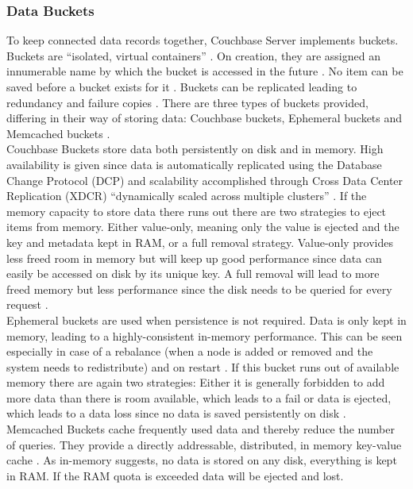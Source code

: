 \subsubsection{Data Buckets}
To keep connected data records together, Couchbase Server implements buckets. Buckets are “isolated, virtual containers” \parencite{objelean}. On creation, they are assigned an innumerable name by which the bucket is accessed in the future \parencite{couchbaseDocuBuckMemStor}. No item can be saved before a bucket exists for it \parencite{couchbaseDocuMemory}. Buckets can be replicated leading to redundancy and failure copies \parencite{couchbaseWeb}. There are three types of buckets provided, differing in their way of storing data: Couchbase buckets, Ephemeral buckets and Memcached buckets \parencite{couchbaseDocuMemory}.\\ 
Couchbase Buckets store data both persistently on disk and in memory. High availability is given since data is automatically replicated using the Database Change Protocol (DCP) and scalability accomplished through Cross Data Center Replication (XDCR) \enquote{dynamically scaled across multiple clusters} \parencite{couchbaseDocuBuckets}. If the memory capacity to store data there runs out there are two strategies to eject items from memory. Either value-only, meaning only the value is ejected and the key and metadata kept in RAM, or a full removal strategy. Value-only provides less freed room in memory but will keep up good performance since data can easily be accessed on disk by its unique key. A full removal will lead to more freed memory but less performance since the disk needs to be queried for every request \parencite{couchbaseDocuBuckets}.\\
Ephemeral buckets are used when persistence is not required. Data is only kept in memory, leading to a highly-consistent in-memory performance. This can be seen especially in case of a rebalance (when a node is added or removed and the system needs to redistribute) and on restart \parencite{couchbaseDocuBuckets}. If this bucket runs out of available memory there are again two strategies: Either it is generally forbidden to add more data than there is room available, which leads to a fail or data is ejected, which leads to a data loss since no data is saved persistently on disk \parencite{couchbaseDocuBuckets}. \\
Memcached Buckets cache frequently used data and thereby reduce the number of queries. They provide a directly addressable, distributed, in memory key-value cache \parencite{couchbaseDocuBuckets}. As in-memory suggests, no data is stored on any disk, everything is kept in RAM. If the RAM quota is exceeded data will be ejected and lost.\\
